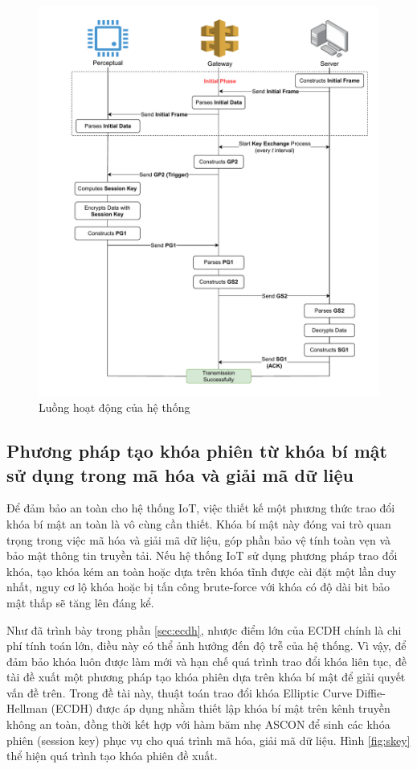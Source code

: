 \begin{figure}[htbp]
    \centering
    \includegraphics[width=1\linewidth]{trans-sys.pdf}
    \caption{Luồng hoạt động của hệ thống}
    \label{fig:trans-sys}
\end{figure}

\subsection{Phương pháp tạo khóa phiên từ khóa bí mật sử dụng trong mã hóa và giải mã dữ liệu}
\label{sec:key}
Để đảm bảo an toàn cho hệ thống IoT, việc thiết kế một phương thức trao đổi khóa bí mật an toàn là vô cùng cần thiết. Khóa bí mật này đóng vai trò quan trọng trong việc mã hóa và giải mã dữ liệu, góp phần bảo vệ tính toàn vẹn và bảo mật thông tin truyền tải. Nếu hệ thống IoT sử dụng phương pháp trao đổi khóa, tạo khóa kém an toàn hoặc dựa trên khóa tĩnh được cài đặt một lần duy nhất, nguy cơ lộ khóa hoặc bị tấn công brute-force với khóa có độ dài bit bảo mật thấp sẽ tăng lên đáng kể. 

Như đã trình bày trong phần \ref{sec:ecdh}, nhược điểm lớn của ECDH chính là chi phí tính toán lớn, điều này có thể ảnh hưởng đến độ trễ của hệ thống. Vì vậy, để đảm bảo khóa luôn được làm mới và hạn chế quá trình trao đổi khóa liên tục, đề tài đề xuất một phương pháp tạo khóa phiên dựa trên khóa bí mật để giải quyết vấn đề trên. Trong đề tài này, thuật toán trao đổi khóa Elliptic Curve Diffie-Hellman (ECDH) được áp dụng nhằm thiết lập khóa bí mật trên kênh truyền không an toàn, đồng thời kết hợp với hàm băm nhẹ ASCON để sinh các khóa phiên (session key) phục vụ cho quá trình mã hóa, giải mã dữ liệu. Hình \ref{fig:skey} thể hiện quá trình tạo khóa phiên đề xuất.

